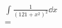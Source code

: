 \documentclass{tufte-handout}
\begin{document}
\begin{align*}
\int \frac{1}{(121+x^2)^2} \dd{x}\\
= 
\end{align*}
\end{document}
